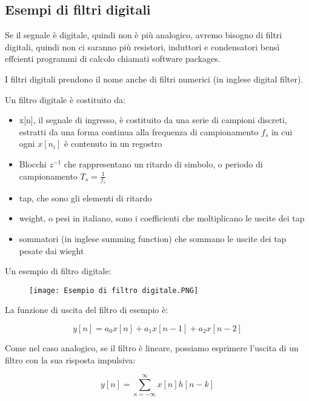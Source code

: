 \newpage 

\subsection{Esempi di filtri digitali} 

Se il segnale è digitale, quindi non è più analogico, avremo bisogno di filtri digitali, 
quindi non ci saranno più resistori, induttori e condensatori bensì effcienti programmi di calcolo 
chiamati software packages. \newline 

I filtri digitali prendono il nome anche di filtri numerici (in inglese digital filter). \newline 

Un filtro digitale è costituito da: 

\begin{itemize}
    \item x[n], il segnale di ingresso, è costituito da una serie di campioni discreti, estratti da una forma continua alla frequenza di campionamento $f_s$ in cui ogni $x[n_i]$ è contenuto in un regostro
    \item Blocchi $z^{-1}$ che rappresentano un ritardo di simbolo, o periodo di campionamento $T_s = \frac{1}{f_s}$ 
    \item tap, che sono gli elementi di ritardo 
    \item weight, o pesi in italiano, sono i coefficienti che moltiplicano le uscite dei tap 
    \item sommatori (in inglese summing function) che sommano le uscite dei tap pesate dai wieght
\end{itemize} 

Un esempio di filtro digitale: 

\begin{figure}[h]
    \centering
    \texttt{[image: Esempio di filtro digitale.PNG]}
\end{figure}  

La funzione di uscita del filtro di esempio è: 

{
    \Large 
    \begin{equation}
        y[n] = a_0 x[n] + a_1 x[n -1] + a_2 x[n-2]
    \end{equation}
}

Come nel caso analogico, se il filtro è lineare, possiamo esprimere l'uscita di un filtro con la sua risposta impulsiva: 

{
    \Large 
    \begin{equation}
        y[n] = \sum_{\kappa = -\infty}^{\infty} x[n] h[n-k]
    \end{equation}
}

